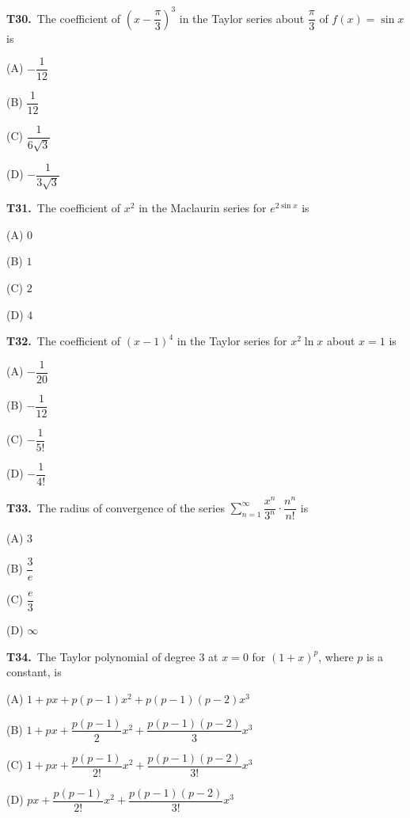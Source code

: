 \documentclass[11pt]{article}
\begin{document}
\bigskip\noindent\textbf{T30.}\ The coefficient of $\left(x-\dfrac{\pi}{3}\right)^3$ in the Taylor series about $\dfrac{\pi}{3}$ of $f(x)=\sin x$ is
\begin{list}{}{\setlength{\leftmargin}{3em}\setlength{\labelwidth}{2.5em}\setlength{\itemsep}{0pt}\setlength{\topsep}{2pt}}
\item[(A)] $-\dfrac{1}{12}$
\item[(B)] $\dfrac{1}{12}$
\item[(C)] $\dfrac{1}{6\sqrt{3}}$
\item[(D)] $-\dfrac{1}{3\sqrt{3}}$
\end{list}

\bigskip\noindent\textbf{T31.}\ The coefficient of $x^2$ in the Maclaurin series for $e^{2\sin x}$ is
\begin{list}{}{\setlength{\leftmargin}{3em}\setlength{\labelwidth}{2.5em}\setlength{\itemsep}{0pt}\setlength{\topsep}{2pt}}
\item[(A)] $0$
\item[(B)] $1$
\item[(C)] $2$
\item[(D)] $4$
\end{list}

\bigskip\noindent\textbf{T32.}\ The coefficient of $(x-1)^4$ in the Taylor series for $x^2\ln x$ about $x=1$ is
\begin{list}{}{\setlength{\leftmargin}{3em}\setlength{\labelwidth}{2.5em}\setlength{\itemsep}{0pt}\setlength{\topsep}{2pt}}
\item[(A)] $-\dfrac{1}{20}$
\item[(B)] $-\dfrac{1}{12}$
\item[(C)] $-\dfrac{1}{5!}$
\item[(D)] $-\dfrac{1}{4!}$
\end{list}

\bigskip\noindent\textbf{T33.}\ The radius of convergence of the series $\displaystyle\sum_{n=1}^\infty \dfrac{x^n}{3^n}\cdot\dfrac{n^n}{n!}$ is
\begin{list}{}{\setlength{\leftmargin}{3em}\setlength{\labelwidth}{2.5em}\setlength{\itemsep}{0pt}\setlength{\topsep}{2pt}}
\item[(A)] $3$
\item[(B)] $\dfrac{3}{e}$
\item[(C)] $\dfrac{e}{3}$
\item[(D)] $\infty$
\end{list}

\bigskip\noindent\textbf{T34.}\ The Taylor polynomial of degree 3 at $x=0$ for $(1+x)^p$, where $p$ is a constant, is
\begin{list}{}{\setlength{\leftmargin}{3em}\setlength{\labelwidth}{2.5em}\setlength{\itemsep}{0pt}\setlength{\topsep}{2pt}}
\item[(A)] $1+px+p(p-1)x^2+p(p-1)(p-2)x^3$
\item[(B)] $1+px+\dfrac{p(p-1)}{2}x^2+\dfrac{p(p-1)(p-2)}{3}x^3$
\item[(C)] $1+px+\dfrac{p(p-1)}{2!}x^2+\dfrac{p(p-1)(p-2)}{3!}x^3$
\item[(D)] $px+\dfrac{p(p-1)}{2!}x^2+\dfrac{p(p-1)(p-2)}{3!}x^3$
\end{list}
\end{document}
